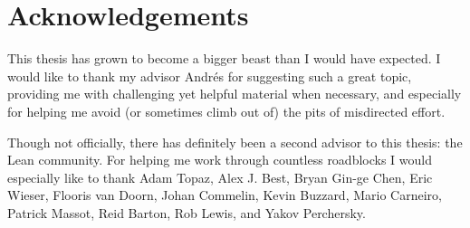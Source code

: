 \documentclass{article}
\begin{document}
\newpage
{}

\section*{Acknowledgements}

This thesis has grown to become a bigger beast than I would have expected.
I would like to thank my advisor Andrés for suggesting such a great topic, providing me with challenging yet helpful material when necessary, and especially for helping me avoid (or sometimes climb out of) the pits of misdirected effort.

\noindent Though not officially, there has definitely been a second advisor to this thesis: the Lean community.
For helping me work through countless roadblocks I would especially like to thank Adam Topaz, Alex J. Best, Bryan Gin-ge Chen, Eric Wieser, Flooris van Doorn, Johan Commelin, Kevin Buzzard, Mario Carneiro, Patrick Massot, Reid Barton, Rob Lewis, and Yakov Perchersky.
\end{document}
